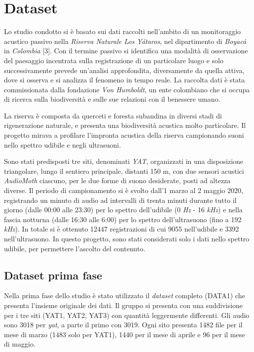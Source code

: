 \chapter{Dataset}
Lo studio condotto si è basato sui dati raccolti nell’ambito di un monitoraggio acustico
passivo nella \textit{Riserva Naturale Los Yátaros}, nel dipartimento di \textit{Boyacá} in \textit{Colombia} [3]. Con il termine passivo si identifica una modalità di osservazione del paesaggio incentrata sulla
registrazione di un particolare luogo e solo successivamente prevede un’analisi approfondita,
diversamente da quella attiva, dove si osserva e si analizza il fenomeno in tempo reale. La
raccolta dati è stata commissionata dalla fondazione \textit{Von Humboldt}, un ente colombiano che
si occupa di ricerca sulla biodiversità e sulle sue relazioni con il benessere umano.

La riserva è composta da querceti e foresta subandina in diversi stadi di rigenerazione
naturale, e presenta una biodiversità acustica molto particolare. Il progetto mirava a profilare
l’impronta acustica della riserva campionando suoni nello spettro udibile e negli ultrasuoni.

Sono stati predisposti tre siti, denominati \textit{YAT}, organizzati in una disposizione triangolare,
lungo il sentiero principale, distanti 150 m, con due sensori acustici \textit{AudioMoth} ciascuno, per
le due forme di suono desiderate, posti ad altezza diverse. Il periodo di campionamento si è
svolto dall’1 marzo al 2 maggio 2020, registrando un minuto di audio ad intervalli di trenta
minuti durante tutto il giorno (dalle 00:00 alle 23:30) per lo spettro dell’udibile (0 \textit{Hz} - 16 \textit{kHz}) e nella fascia notturna (dalle 16:30 alle 6:00) per lo spettro dell’ultrasuono (fino a 192 \textit{kHz}). In totale si è ottenuto 12447 registrazioni di cui 9055 nell'udibile e 3392 nell’ultrasuono. In questo progetto, sono stati considerati solo i dati nello spettro udibile, per permettere l’ascolto del contenuto.

\section{Dataset prima fase}
Nella prima fase dello studio è stato utilizzato il \textit{dataset} completo (DATA1) che presenta
l’insieme originale dei dati. Il gruppo si presenta con una suddivisione per i tre siti (YAT1,
YAT2, YAT3) con quantità leggermente differenti. Gli audio sono 3018 per \textit{yat}, a parte il
primo con 3019. Ogni sito presenta 1482 file per il mese di marzo (1483 solo per YAT1),
1440 per il mese di aprile e 96 per il mese di maggio.

